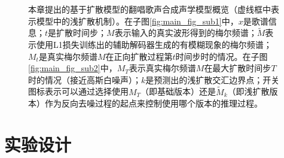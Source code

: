 \begin{figure}[!h]
    \centering
    \caption{本章提出的基于扩散模型的翻唱歌声合成声学模型概览（虚线框中表示模型中的浅扩散机制）。在子图\ref{fig:main_fig_sub1}中，$x$是歌谱信息；$t$是扩散时间步；$M$表示输入的真实波形得到的梅尔频谱；$\widetilde{M}$表示使用L1损失训练出的辅助解码器生成的有模糊现象的梅尔频谱；$M_t$是真实梅尔频谱$M$在正向扩散过程第$t$时间步时的情况。在子图\ref{fig:main_fig_sub2}中，$M_T$表示真实梅尔频谱$M$在最大扩散时间步$T$时的情况（接近高斯白噪声）；$k$是预测出的浅扩散交汇边界点；开关图标表示可以通过选择使用$M_T$（即基础版本）还是$\widetilde{M}_k$（即浅扩散版本）作为反向去噪过程的起点来控制使用哪个版本的推理过程。}
    \label{fig:main_fig}
\end{figure}
\section{实验设计}

